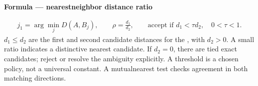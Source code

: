 \documentclass[letterpaper,11pt,english,openany,oneside]{jupyterBook}
\begin{document}
\begin{TextbookBox}
\textbf{Formula — nearest\sphinxhyphen{}neighbor distance ratio}\par\smallskip
\begin{equation}\label{equation:lectures/lecture05/descriptors:eq-lec05-ratio}
\begin{split}j_1=\arg\min_jD(A,B_j),\qquad
\rho=\frac{d_1}{d_2},\qquad
\text{accept if }d_1<\tau d_2,\quad 0<\tau<1.\end{split}
\end{equation}
\sphinxAtStartPar
\(d_1\le d_2\) are the first and second candidate distances for the , with \(d_2>0\). A small ratio indicates a distinctive nearest candidate. If \(d_2=0\), there are tied exact candidates; reject or resolve the ambiguity explicitly. A threshold is a chosen policy, not a universal constant. A mutual\sphinxhyphen{}nearest test checks agreement in both matching directions.

\end{TextbookBox}
\end{document}
